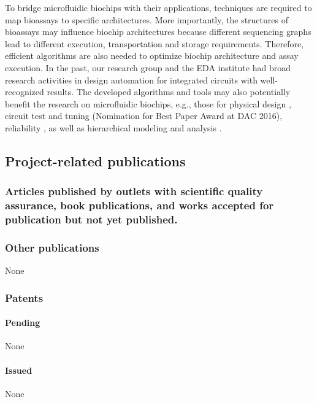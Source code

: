 To bridge microfluidic biochips with their applications, 
techniques are required to map bioassays to specific
architectures. More importantly, the structures of bioassays may influence
biochip architectures because different sequencing graphs lead to different
execution, transportation and storage requirements.
Therefore, efficient algorithms are also needed to optimize biochip
architecture and assay execution. 
In the past, our research group and the EDA institute 
had broad research activities in design automation for integrated circuits with
well-recognized results. The developed algorithms and tools may also
potentially benefit the research on microfluidic biochips, e.g., those for
physical design \cite{Spindler2008}, circuit test and tuning \cite{ZhangLS16} 
(Nomination for Best Paper Award at DAC 2016),
reliability \cite{Barke2015}, as well as hierarchical modeling and analysis
\cite{Li2013}. 


\vskip 20pt
\subsection{Project-related publications}

\subsubsection{Articles published by outlets with scientific quality
assurance, book publications, and works accepted for publication but not yet published.}



\vskip 10pt
\subsubsection{Other publications}
None
\vskip 10pt
\subsubsection{Patents}
\vskip 1pt
\paragraph{Pending}
None
\vskip 10pt
\paragraph{Issued}
None





